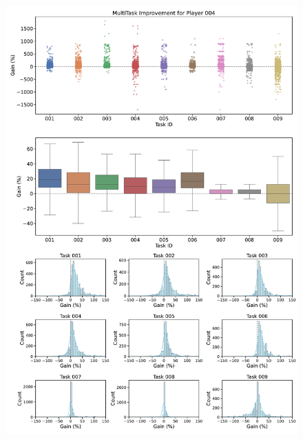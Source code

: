 \begin{figure}[ht]
  \centering
  \includegraphics[width=\textwidth]{figures/gain_validity/multitask/multitask_gain_player_00004.pdf}
\end{figure}
\clearpage

